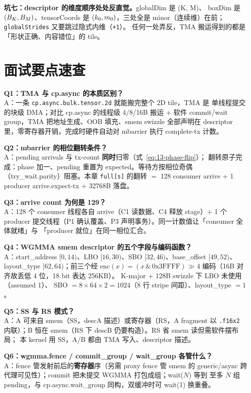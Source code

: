 \textbf{坑七：descriptor 的维度顺序处处反直觉。}\allowbreak{}globalDim 是 (K, M)、
boxDim 是 $(B\sb{K}, B\sb{M})$、tensorCoords 是 $(k\sb{0}, m\sb{0})$，三处全是
minor（连续维）在前；\texttt{global\allowbreak{}Strides} 又要跳过隐式内维（\texttt{+1}）。
任何一处弄反，TMA 搬运得到的都是「形状正确、内容错位」的 tile。

\section{面试要点速查}

\textbf{Q1：TMA 与 cp.async 的本质区别？}\\
A：一条 \texttt{cp.\allowbreak{}async.\allowbreak{}bulk.\allowbreak{}tensor.2d} 就能搬完整个 2D tile，TMA 是
单线程提交的块级 DMA；对比 cp.async 的线程级 4/8/16B 搬运 + 软件
commit/wait group，TMA 把地址生成、OOB 填充、smem swizzle 全部声明在
descriptor 里，零寄存器开销，完成时硬件自动对 mbarrier 执行 complete-tx 计数。

\textbf{Q2：mbarrier 的相位翻转条件？}\\
A：pending arrivals 与 tx-count \textbf{同时}归零（式~\ref{eq:13-phase-flip}）；
翻转原子完成：phase 加一、pending 重置为 expected。等待方按相位奇偶
（try\_wait.parity）阻塞。本章 \texttt{full[s]} 的翻转 $=$ 128 consumer arrive
+ 1 producer arrive.expect-tx + 32768B 落盘。

\textbf{Q3：arrive count 为何是 129？}\\
A：128 个 consumer 线程各自 arrive（C1 读数据、C4 释放 stage）+ 1 个 producer
提交线程（P1 确认覆盖、P3 声明事务）。同一计数值让「consumer 全体就绪」与
「producer 就位」在同一相位汇合。

\textbf{Q4：WGMMA smem descriptor 的五个字段与编码函数？}\\
A：start\_address $[0,14)$、LBO $[16,30)$、SBO $[32,46)$、base\_offset $[49,52)$、
layout\_type $[62,64)$；前三个经 $\mathrm{enc}(x) = (x \,\&\,
\mathrm{0x3FFFF}) \gg 4$ 编码（16B 对齐故丢低 4 位，18 bit 表达 256KB）。
K-major + 128B swizzle 下 LBO 未使用（assumed 1）、
SBO $= 8 \times 64 \times 2 = 1024$（8 行 stripe 间距）、layout\_type $= 1$。

\textbf{Q5：SS 与 RS 模式？}\\
A：A 可来自 smem（SS，descA 描述）或寄存器（RS，A fragment 以 \texttt{.f16x2}
内联）；B 恒在 smem（RS 下 descB 仍要构造）。RS 省 smem 读但需软件摆布局；
本 kernel 用 SS，A/B 都由 TMA 写入、descriptor 描述。

\textbf{Q6：wgmma.fence / commit\_group / wait\_group 各管什么？}\\
A：fence 管发射前后的\textbf{寄存器}序（另需 proxy fence 管 smem 的
generic/async 跨代理可见性）；commit 把未提交 WGMMA 打包成组；wait($N$) 等到
至多 $N$ 组 pending，与 cp.async.wait\_group 同构，双缓冲时可 wait(1) 换重叠。

